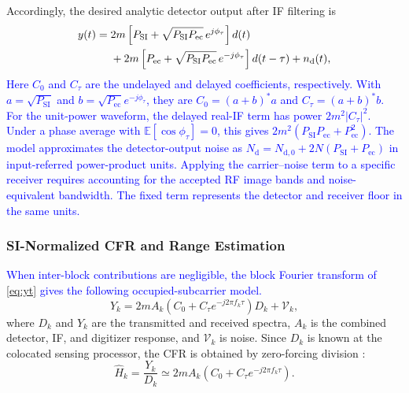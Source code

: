 \documentclass[10pt,journal]{IEEEtran}
\DeclareRobustCommand{\rev}[1]{\textcolor{blue}{#1}}
\begin{document}
Accordingly, the desired analytic detector output after IF filtering is
\begin{align}
y(t)={}&
2m\left[
P_{\mathrm{SI}}
+\sqrt{P_{\mathrm{SI}}P_{\mathrm{ec}}}\,e^{j\phi_\tau}
\right]d(t)
\notag\\
&+
2m\left[
P_{\mathrm{ec}}
+\sqrt{P_{\mathrm{SI}}P_{\mathrm{ec}}}\,e^{-j\phi_\tau}
\right]d(t-\tau)
+n_{\mathrm d}(t),
\label{eq:yt}
\end{align}
\rev{Here $C_0$ and $C_\tau$ are the undelayed and delayed coefficients,
respectively. With $a=\sqrt{P_{\mathrm{SI}}}$ and
$b=\sqrt{P_{\mathrm{ec}}}e^{-j\phi_\tau}$, they are
$C_0=(a+b)^*a$ and $C_\tau=(a+b)^*b$. For the unit-power waveform,
the delayed real-IF term has power $2m^2|C_\tau|^2$. Under a phase
average with $\mathbb{E}[\cos\phi_\tau]=0$, this gives
$2m^2(P_{\mathrm{SI}}P_{\mathrm{ec}}+P_{\mathrm{ec}}^2)$.
The model approximates the detector-output noise as
$N_{\mathrm d}=N_{\mathrm{d},0}+2N(P_{\mathrm{SI}}+P_{\mathrm{ec}})$
in input-referred power-product units. Applying the carrier--noise
term to a specific receiver requires accounting for the accepted
RF image bands and noise-equivalent bandwidth. The fixed term
represents the detector and receiver floor in the same units.}

\subsubsection{SI-Normalized CFR and Range Estimation}
\label{sec:range_est}

\rev{When inter-block contributions are negligible, the block Fourier
transform of \eqref{eq:yt} gives the following occupied-subcarrier model.}
\begin{equation}
Y_k
=
2mA_k\left(C_0+C_\tau e^{-j2\pi f_k\tau}\right)D_k
+\mathcal V_k,
\label{eq:Yk}
\end{equation}
where $D_k$ and $Y_k$ are the transmitted and received spectra,
$A_k$ is the combined detector, IF, and digitizer response, and
$\mathcal V_k$ is noise. Since $D_k$ is known at the colocated sensing
processor, the CFR is obtained by zero-forcing division \cite{sturm_waveform_2011}:
\begin{equation}
\widehat H_k
=
\frac{Y_k}{D_k}
\simeq
2mA_k\left(C_0+C_\tau e^{-j2\pi f_k\tau}\right).
\label{eq:cfr}
\end{equation}
\end{document}
